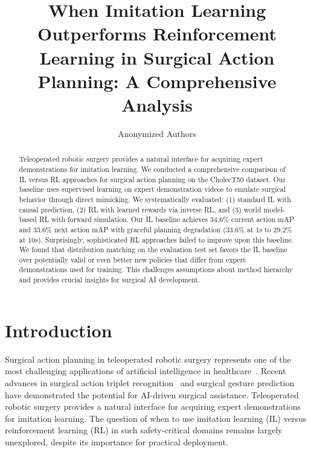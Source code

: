 \documentclass[runningheads]{llncs}
\begin{document}
%
\title{When Imitation Learning Outperforms Reinforcement Learning in Surgical Action Planning: A Comprehensive Analysis}
%
\author{Anonymized Authors}

\maketitle              %
%
\begin{abstract}
Teleoperated robotic surgery provides a natural interface for acquiring expert demonstrations for imitation learning. We conducted a comprehensive comparison of IL versus RL approaches for surgical action planning on the CholecT50 dataset. Our baseline uses supervised learning on expert demonstration videos to emulate surgical behavior through direct mimicking. We systematically evaluated: (1) standard IL with causal prediction, (2) RL with learned rewards via inverse RL, and (3) world model-based RL with forward simulation. Our IL baseline achieves 34.6\% current action mAP and 33.6\% next action mAP with graceful planning degradation (33.6\% at 1s to 29.2\% at 10s). Surprisingly, sophisticated RL approaches failed to improve upon this baseline. We found that distribution matching on the evaluation test set favors the IL baseline over potentially valid or even better new policies that differ from expert demonstrations used for training. This challenges assumptions about method hierarchy and provides crucial insights for surgical AI development.

\end{abstract}


\section{Introduction}

Surgical action planning in teleoperated robotic surgery represents one of the most challenging applications of artificial intelligence in healthcare~\cite{nwoye2022cholect50,nwoye2020recognition}. Recent advances in surgical action triplet recognition~\cite{nwoye2023cholectriplet2021} and surgical gesture prediction~\cite{shi2022recognition,weerasinghe2024multimodal} have demonstrated the potential for AI-driven surgical assistance. Teleoperated robotic surgery provides a natural interface for acquiring expert demonstrations for imitation learning. The question of when to use imitation learning (IL) versus reinforcement learning (RL) in such safety-critical domains remains largely unexplored, despite its importance for practical deployment.
\end{document}
